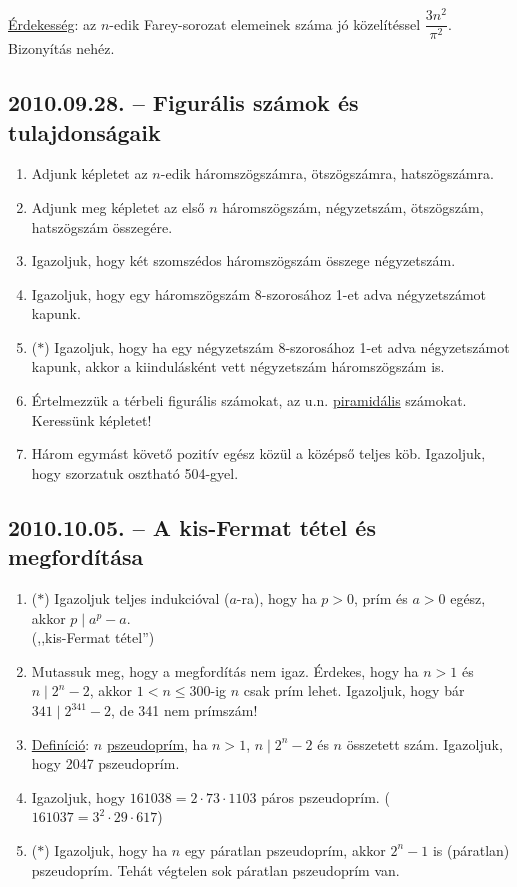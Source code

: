\documentclass{article}
\begin{document}
\underline{Érdekesség}: az $n$-edik Farey-sorozat elemeinek száma jó közelítéssel $\dfrac{3n^2}{\pi^2}$. Bizonyítás nehéz.

\subsection*{2010.09.28. -- Figurális számok és tulajdonságaik}
\begin{enumerate}
\item Adjunk képletet az $n$-edik háromszögszámra, ötszögszámra, hatszögszámra.
\item Adjunk meg képletet az első $n$ háromszögszám, négyzetszám, ötszögszám, hatszögszám összegére.
\item Igazoljuk, hogy két szomszédos háromszögszám összege négyzetszám.
\item Igazoljuk, hogy egy háromszögszám 8-szorosához 1-et adva négyzetszámot kapunk.
\item ($*$) Igazoljuk, hogy ha egy négyzetszám 8-szorosához 1-et adva négyzetszámot kapunk, akkor a kiindulásként vett négyzetszám háromszögszám is.
\item Értelmezzük a térbeli figurális számokat, az u.n. \underline{piramidális} számokat. Keressünk képletet!
\item Három egymást követő pozitív egész közül a középső teljes köb. Igazoljuk, hogy szorzatuk osztható 504-gyel. 
\end{enumerate}

\subsection*{2010.10.05. -- A kis-Fermat tétel és megfordítása}
\begin{enumerate}
\item ($*$) Igazoljuk teljes indukcióval ($a$-ra), hogy ha $p>0$, prím és $a>0$ egész, akkor $p\mid a^p-a$.\\ (,,kis-Fermat tétel'')
\item Mutassuk meg, hogy a megfordítás nem igaz. Érdekes, hogy ha $n>1$ és $n\mid 2^n-2$, akkor $1<n\le 300$-ig $n$ csak prím lehet. Igazoljuk, hogy bár $341\mid 2^{341}-2$, de 341 nem prímszám!
\item \underline{Definíció}: $n$ \underline{pszeudoprím}, ha $n>1$, $n\mid 2^n-2$
és $n$ összetett szám. Igazoljuk, hogy 2047 pszeudoprím.
\item Igazoljuk, hogy $161038=2\cdot 73\cdot 1103$ páros pszeudoprím. 
($161037=3^2\cdot 29\cdot 617$)
\item ($*$) Igazoljuk, hogy ha $n$ egy páratlan pszeudoprím, akkor $2^n-1$ is
(páratlan) pszeudoprím. Tehát végtelen sok páratlan pszeudoprím van.
\end{enumerate}
\end{document}
